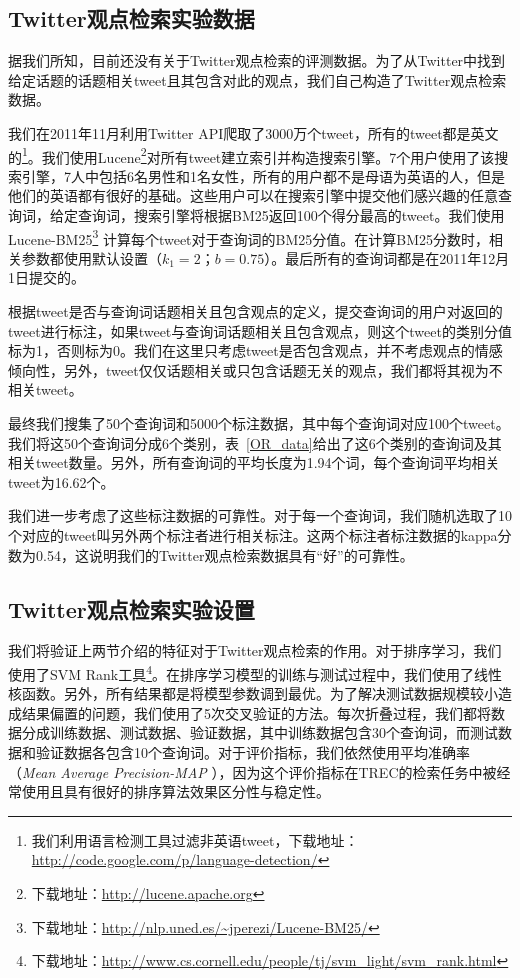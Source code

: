 \subsection{Twitter观点检索实验数据}
据我们所知，目前还没有关于Twitter观点检索的评测数据。为了从Twitter中找到给定话题的话题相关tweet且其包含对此的观点，我们自己构造了Twitter观点检索数据。

我们在2011年11月利用Twitter API爬取了3000万个tweet，所有的tweet都是英文的\footnote{我们利用语言检测工具过滤非英语tweet，下载地址：\url{http://code.google.com/p/language-detection/}}。我们使用Lucene\footnote{下载地址：\url{http://lucene.apache.org}}对所有tweet建立索引并构造搜索引擎。7个用户使用了该搜索引擎，7人中包括6名男性和1名女性，所有的用户都不是母语为英语的人，但是他们的英语都有很好的基础。这些用户可以在搜索引擎中提交他们感兴趣的任意查询词，给定查询词，搜索引擎将根据BM25返回100个得分最高的tweet。我们使用Lucene-BM25\footnote{下载地址：\url{http://nlp.uned.es/~jperezi/Lucene-BM25/}} 计算每个tweet对于查询词的BM25分值。在计算BM25分数时，相关参数都使用默认设置（$k_1=2$；$b=0.75$）。最后所有的查询词都是在2011年12月1日提交的。

根据tweet是否与查询词话题相关且包含观点的定义，提交查询词的用户对返回的tweet进行标注，如果tweet与查询词话题相关且包含观点，则这个tweet的类别分值标为1，否则标为0。我们在这里只考虑tweet是否包含观点，并不考虑观点的情感倾向性，另外，tweet仅仅话题相关或只包含话题无关的观点，我们都将其视为不相关tweet。


最终我们搜集了50个查询词和5000个标注数据，其中每个查询词对应100个tweet。我们将这50个查询词分成6个类别，表~\ref{OR_data}给出了这6个类别的查询词及其相关tweet数量。另外，所有查询词的平均长度为1.94个词，每个查询词平均相关tweet为16.62个。


我们进一步考虑了这些标注数据的可靠性。对于每一个查询词，我们随机选取了10个对应的tweet叫另外两个标注者进行相关标注。这两个标注者标注数据的kappa分数为0.54，这说明我们的Twitter观点检索数据具有“好”的可靠性。

\subsection{Twitter观点检索实验设置}
我们将验证上两节介绍的特征对于Twitter观点检索的作用。对于排序学习，我们使用了SVM Rank工具\footnote{下载地址：\url{http://www.cs.cornell.edu/people/tj/svm_light/svm_rank.html}}。在排序学习模型的训练与测试过程中，我们使用了线性核函数。另外，所有结果都是将模型参数调到最优。为了解决测试数据规模较小造成结果偏置的问题，我们使用了5次交叉验证的方法。每次折叠过程，我们都将数据分成训练数据、测试数据、验证数据，其中训练数据包含30个查询词，而测试数据和验证数据各包含10个查询词。对于评价指标，我们依然使用平均准确率（\emph{Mean Average Precision-MAP} ），因为这个评价指标在TREC的检索任务中被经常使用且具有很好的排序算法效果区分性与稳定性。

